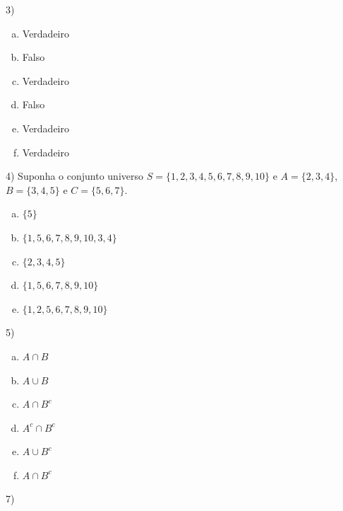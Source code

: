 \documentclass[12pt]{article}
\begin{document}
\vspace{5px}

3) 

\begin{enumerate}[a)]
    \item Verdadeiro
    \item Falso
    \item Verdadeiro
    \item Falso
    \item Verdadeiro
    \item Verdadeiro
\end{enumerate}

\vspace{5px}

4) Suponha o conjunto universo $S= \{1,2,3,4,5,6,7,8,9,10\}$ e $A=\{2,3,4\}$, $B=\{3,4,5\}$ e $C=\{5,6,7\}$. 

\begin{enumerate}[a)] %
    \item $\{5\}$ 
    \item $\{1,5,6,7,8,9,10, 3,4\}$ 
    \item $\{2,3,4,5\}$ 
    \item $\{1,5,6,7,8,9,10\}$
    \item $\{1,2,5,6,7,8,9,10\}$
\end{enumerate}
\vspace{10px}

\vspace{5px}


5) 

\begin{enumerate}[a)]
    \item $A \cap B$
    \item $A \cup B$
    \item $A \cap B^c$
    \item $A^c \cap B^c$
    \item $A \cup B^c$
    \item $A \cap B^c$ 
\end{enumerate}

\vspace{5px}


7) 
\end{document}
